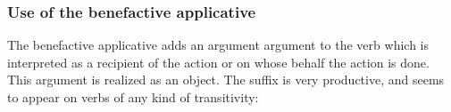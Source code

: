 %
%

\subsubsection{Use of the benefactive applicative}

The benefactive applicative adds an argument argument to the verb which is interpreted as a recipient of the action or on whose behalf the action is done. This argument is realized as an object. The suffix is very productive, and seems to appear on verbs of any kind of transitivity:


